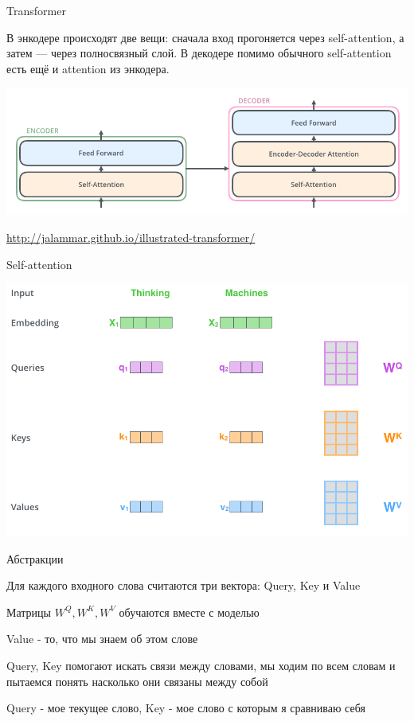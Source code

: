 \documentclass[notes,12pt, aspectratio=169]{beamer}
\newenvironment{wideitemize}{\itemize\addtolength{\itemsep}{10pt}}{\enditemize}
\begin{document}
\begin{frame}{Transformer} 

В энкодере происходят две вещи: сначала вход прогоняется через self-attention, а затем —
через полносвязный слой. В декодере помимо обычного self-attention есть ещё и attention
из энкодера.

\begin{center}
	\includegraphics[width=.8\linewidth]{tranformer03.png}
\end{center}
\vfill
\footnotesize
{\color{blue} \url{http://jalammar.github.io/illustrated-transformer/}}
\end{frame}


\begin{frame}{Self-attention} 
\begin{center}
	\includegraphics[width=.7\linewidth]{selfattention.png}
\end{center}
\end{frame}


\begin{frame}{Абстракции}
\begin{wideitemize}
	\item  Для каждого входного слова считаются три вектора: Query, Key и Value
	\item  Матрицы $W^Q, W^K , W^V$ обучаются вместе с моделью
	\item  Value - то, что мы знаем об этом слове
	\item  Query, Key помогают искать связи между словами, мы ходим по всем словам и пытаемся понять насколько они связаны между собой 
	\item Query - мое текущее слово, Key - мое слово с которым я сравниваю себя
\end{wideitemize}
\end{frame}
\end{document}
